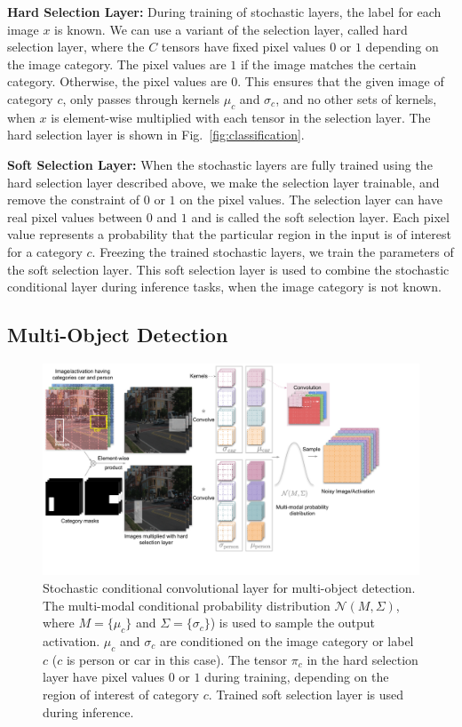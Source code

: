 \documentclass[12pt, letterpaper]{article}
\begin{document}
\noindent \textbf{ Hard Selection Layer:}
During training of stochastic layers, the label for each image $x$ is known. We can use a variant of the selection layer, called hard selection layer, where the $C$ tensors have fixed pixel values $0$ or $1$ depending on the image category. The pixel values are $1$ if the image matches the certain category. Otherwise, the pixel values are $0$. This ensures that the given image of category $c$, only passes through kernels $\mu_c$ and $\sigma_c$, and no other sets of kernels, when $x$ is element-wise multiplied with each tensor in the selection layer. The hard selection layer is shown in Fig.~\ref{fig:classification}. 

\noindent \textbf{Soft Selection Layer:} When the stochastic layers are fully trained using the hard selection layer described above, we make the selection layer trainable, and remove the constraint of $0$ or $1$ on the pixel values. The selection layer can have real pixel values between $0$ and $1$ and is called the soft selection layer. Each pixel value represents a probability that the particular region in the input is of interest for a category $c$. Freezing the trained stochastic layers, we train the parameters of the soft selection layer. This soft selection layer is used to combine the stochastic conditional layer during inference tasks, when the image category is not known.

\subsection{Multi-Object Detection}
\label{sec:detection}
\begin{figure}[h!]
    \centering
    \includegraphics[width=\textwidth, trim={0cm 1.6cm 2.7cm 0cm}, clip]{Detection Conditional noise layer.pdf}
    \caption{Stochastic conditional convolutional layer for multi-object detection. The multi-modal conditional probability distribution $\mathcal{N}(M, \Sigma)$, where $M=\{\mu_c\}$ and $\Sigma=\{\sigma_c\}$) is used to sample the output activation. $\mu_c$ and $\sigma_c$ are conditioned on the image category or label $c$ ($c$ is person or car in this case). The tensor $\pi_c$ in the hard selection layer have pixel values $0$ or $1$ during training, depending on the region of interest of category $c$. Trained soft selection layer is used during inference.}
    \label{fig:det}
\end{figure}
\end{document}
